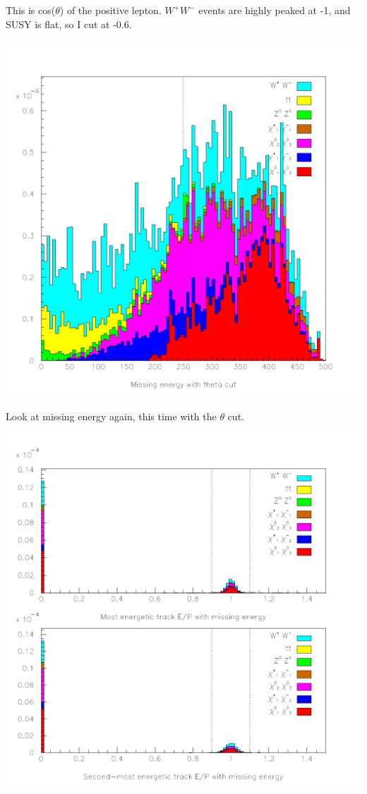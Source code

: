 \documentclass[landscape]{article}
\begin{document}
This is cos($\theta$) of the positive lepton.  $W^+W^-$ events are
highly peaked at -1, and SUSY is flat, so I cut at -0.6.

\pagebreak

\begin{center} \includegraphics[height=0.8\textheight]{withtheta_3.pdf} \end{center}

Look at missing energy again, this time with the $\theta$ cut.

\pagebreak

\begin{center} \includegraphics[height=0.8\textheight]{withtheta_4.pdf} \end{center}
\end{document}
